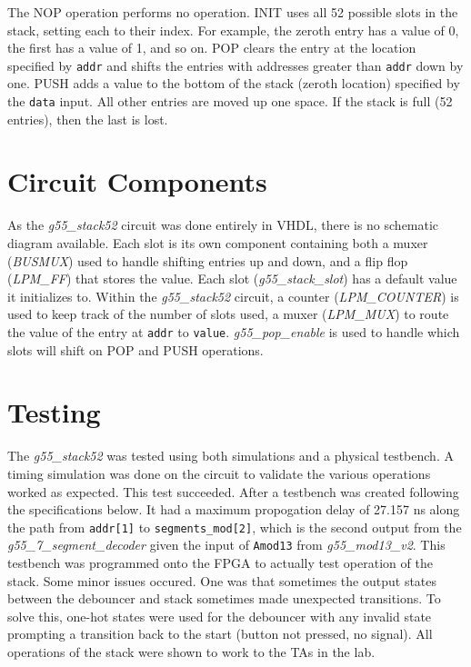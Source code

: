 \documentclass[12pt]{article}
\begin{document}
The NOP operation performs no operation. INIT uses all 52 possible slots in the stack, setting each to their index. For example, the zeroth entry has a value of 0, the first has a value of 1, and so on. POP clears the entry at the location specified by \texttt{addr} and shifts the entries with addresses greater than \texttt{addr} down by one. PUSH adds a value to the bottom of the stack (zeroth location) specified by the \texttt{data} input. All other entries are moved up one space. If the stack is full (52 entries), then the last is lost.\\

\section{Circuit Components}
As the \textit{g55\_stack52} circuit was done entirely in VHDL, there is no schematic diagram available. Each slot is its own component containing both a muxer (\textit{BUSMUX}) used to handle shifting entries up and down, and a flip flop (\textit{LPM\_FF}) that stores the value. Each slot (\textit{g55\_stack\_slot}) has a default value it initializes to. Within the \textit{g55\_stack52} circuit, a counter (\textit{LPM\_COUNTER}) is used to keep track of the number of slots used, a muxer (\textit{LPM\_MUX}) to route the value of the entry at \texttt{addr} to \texttt{value}. \textit{g55\_pop\_enable} is used to handle which slots will shift on POP and PUSH operations.\\

\section{Testing}
The \textit{g55\_stack52} was tested using both simulations and a physical testbench. A timing simulation was done on the circuit to validate the various operations worked as expected. This test succeeded. After a testbench was created following the specifications below. It had a maximum propogation delay of 27.157 ns along the path from \texttt{addr[1]} to \texttt{segments\_mod[2]}, which is the second output from the \textit{g55\_7\_segment\_decoder} given the input of \texttt{Amod13} from \textit{g55\_mod13\_v2}. This testbench was programmed onto the FPGA to actually test operation of the stack. Some minor issues occured. One was that sometimes the output states between the debouncer and stack sometimes made unexpected transitions. To solve this, one-hot states were used for the debouncer with any invalid state prompting a transition back to the start (button not pressed, no signal). All operations of the stack were shown to work to the TAs in the lab.\\
\end{document}
